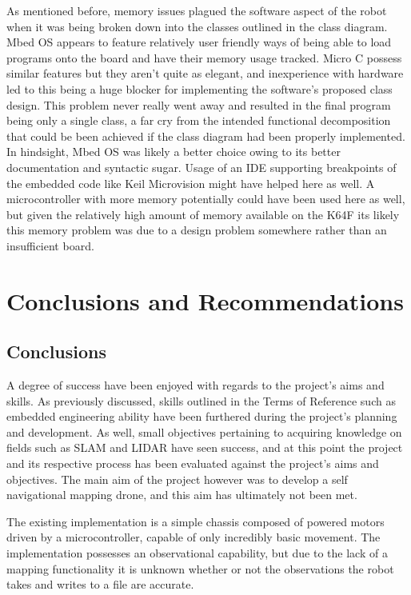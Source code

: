 		As mentioned before, memory issues plagued the software aspect of the robot when it was being broken down into the classes outlined in the class diagram. Mbed OS appears to feature relatively user friendly ways of being able to load programs onto the board and have their memory usage tracked. Micro C possess similar features but they aren't quite as elegant, and inexperience with hardware led to this being a huge blocker for implementing the software's proposed class design. This problem never really went away and resulted in the final program being only a single class, a far cry from the intended functional decomposition that could be been achieved if the class diagram had been properly implemented. In hindsight, Mbed OS was likely a better choice owing to its better documentation and syntactic sugar. Usage of an IDE supporting breakpoints of the embedded code like Keil Microvision might have helped here as well. A microcontroller with more memory potentially could have been used here as well, but given the relatively high amount of memory available on the K64F its likely this memory problem was due to a design problem somewhere rather than an insufficient board.
	
	\chapter{Conclusions and Recommendations}
		\section{Conclusions}	
		A degree of success have been enjoyed with regards to the project's aims and skills. As previously discussed, skills outlined in the Terms of Reference such as embedded engineering ability have been furthered during the project's planning and development. As well, small objectives pertaining to acquiring knowledge on fields such as SLAM and LIDAR have seen success, and at this point the project and its respective process has been evaluated against the project's aims and objectives. The main aim of the project however was to develop a self navigational mapping drone, and this aim has ultimately not been met.
		
		The existing implementation is a simple chassis composed of powered motors driven by a microcontroller, capable of only incredibly basic movement. The implementation possesses an observational capability, but due to the lack of a mapping functionality it is unknown whether or not the observations the robot takes and writes to a file are accurate.
		
